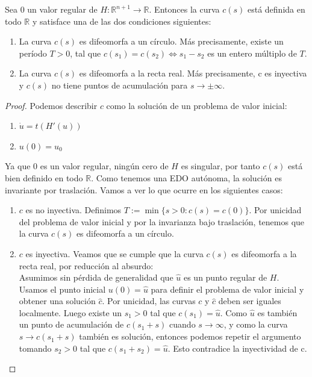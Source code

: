 \begin{theorem}\label{homotopy-continuation-c-teorema}
	Sea $0$ un valor regular de $H:\mathbb{R}^{n+1}\to\mathbb{R}$. Entonces la curva $c(s)$ está definida en todo $\mathbb{R}$ y satisface una de las dos condiciones siguientes:
	\begin{enumerate}
		\item La curva $c(s)$ es difeomorfa a un círculo. Más precisamente, existe un período $T > 0$, tal que $c(s_1) = c(s_2) \Leftrightarrow s_1 - s_2$ es un entero múltiplo de $T$.
		\item La curva $c(s)$ es difeomorfa a la recta real. Más precisamente, c es inyectiva y $c(s)$ no tiene puntos de acumulación para $s \rightarrow \pm \infty$. 
	\end{enumerate}
\end{theorem}
\begin{proof}
	Podemos describir $c$ como la solución de un problema de valor inicial:
	\begin{enumerate}
		\item $\dot{u} = t(H'(u))$
		\item $u(0) = u_0$
	\end{enumerate}
	Ya que $0$ es un valor regular, ningún cero de $H$ es singular, por tanto $c(s)$ está bien definido en todo $\mathbb{R}$. Como tenemos una EDO autónoma, la solución es invariante por traslación. Vamos a ver lo que ocurre en los siguientes casos:
	\begin{enumerate}
		\item $c$ es no inyectiva. Definimos $T := \min \{ s>0 : c(s) = c(0)\}$. Por unicidad del problema de valor inicial y por la invarianza bajo traslación, tenemos  que la curva $c(s)$ es difeomorfa a un círculo.
		\item $c$ es inyectiva. Veamos que se cumple que la curva $c(s)$ es difeomorfa a la recta real, por reducción al absurdo: \\
		Asumimos sin pérdida de generalidad que $\hat{u}$ es un punto regular de $H$. Usamos el punto inicial $u(0) = \hat{u}$ para definir el problema de valor inicial y obtener una solución $\hat{c}$. Por unicidad, las curvas $c$ y $\hat{c}$ deben ser iguales localmente. Luego existe un $s_1 > 0$ tal que $c(s_1) = \hat{u}$. Como $\hat{u}$ es también un punto de acumulación de $c(s_1 + s)$ cuando $s \longrightarrow \infty$, y como la curva $s \rightarrow c(s_1 + s)$ también es solución, entonces podemos repetir el argumento tomando $s_2 > 0$ tal que $c(s_1 + s_2) = \hat{u}$. Esto contradice la inyectividad de c.
	\end{enumerate}
\end{proof}

